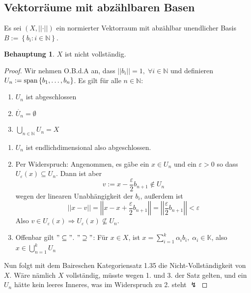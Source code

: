 \documentclass[ngerman]{article}
\theoremstyle{definition}%
\newtheorem*{beh}{Behauptung}
\newcommand{\N}{\mathbb{N}}
\newcommand{\K}{\mathbb{K}}
\newcommand{\norm}[1]{\left\lvert \left\lvert #1 \right\rvert \right\rvert}
\newcommand{\df}{\Rightarrow} %
\newcommand{\afs}{"{}}
\newcommand{\aufspan}{\textnormal{span}}
\renewcommand{\{ }{\left\lbrace}
\renewcommand{\}}{\right\rbrace}
\begin{document}
\subsection{Vektorräume mit abzählbaren Basen}
Es sei $(X,\norm{\cdot})$ ein normierter Vektorraum mit abzählbar unendlicher Basis $B:=\{b_i : i\in\N\}$.
\begin{beh}
	$X$ ist nicht vollständig.
\end{beh}
\begin{proof}
	Wir nehmen O.B.d.A an, dass $\norm{b_i} = 1,\;\forall i\in\N$
	und definieren $U_n := \aufspan \{b_1,\dots,b_n\}$. Es gilt für alle $n\in\N$:
	\begin{enumerate}
		\item $U_n$ ist abgeschlossen
		\item $\mathring{U_n}=\emptyset$
		\item $\bigcup_{n\in\N} U_n = X$
	\end{enumerate}
	\begin{enumerate}[1:]
		\item $U_n$ ist endlichdimensional also abgeschlossen.
		\item Per Widerspruch: Angenommen, es gäbe ein $x\in U_n$ und ein $\varepsilon>0$ so dass $U_\varepsilon(x)\subseteq U_n$. Dann ist aber 
		$$v := x - \frac{\varepsilon}{2} b_{n+1}\not \in U_n$$
		 wegen der linearen Unabhängigkeit der $b_i$, außerdem ist 
		 $$\norm{x-v} = \norm{x-x+\frac{\varepsilon}{2}b_{n+1}} = \norm{\frac{\varepsilon}{2} b_{n+1}} < \varepsilon$$
		 Also $v\in U_\varepsilon(x)\df U_\varepsilon(x) \not \subseteq U_n$.
		\item Offenbar gilt $\afs\subseteq\afs$. $\afs \supseteq \afs$: Für $x\in X$, ist $x=\sum^k_{i=1} \alpha_ib_i,\;\alpha_i\in\K$, also $x\in \bigcup^k_{n=1} U_n$
	\end{enumerate}
	Nun folgt mit dem Baireschen Kategoriensatz 1.35 die Nicht-Vollständigkeit von $X$. Wäre nämlich $X$ vollständig, müsste wegen 1. und 3. der Satz gelten, 
	und ein $U_n$ hätte kein leeres Inneres, was im Widerspruch zu 2. steht $\lightning$
\end{proof}

\end{document}
